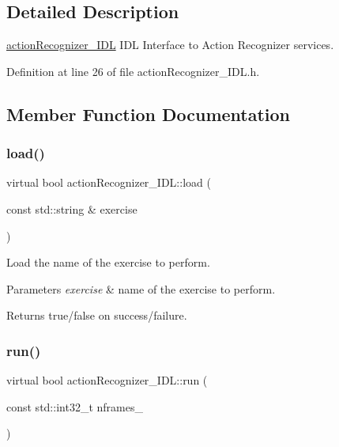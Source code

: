 \subsection{Detailed Description}
\mbox{\hyperlink{classactionRecognizer__IDL}{action\+Recognizer\+\_\+\+I\+DL}} I\+DL Interface to Action Recognizer services. 

Definition at line 26 of file action\+Recognizer\+\_\+\+I\+D\+L.\+h.



\subsection{Member Function Documentation}
\mbox{\label{classactionRecognizer__IDL_a59683b66e727607a3e12c0ab22d2d069}} 
\subsubsection{\texorpdfstring{load()}{load()}}
{\footnotesize\ttfamily virtual bool action\+Recognizer\+\_\+\+I\+D\+L\+::load (\begin{DoxyParamCaption}\item[{const std\+::string \&}]{exercise }\end{DoxyParamCaption})\hspace{0.3cm}{\ttfamily [virtual]}}



Load the name of the exercise to perform. 


\begin{DoxyParams}{Parameters}
{\em exercise} & name of the exercise to perform. \\
\hline
\end{DoxyParams}
\begin{DoxyReturn}{Returns}
true/false on success/failure. 
\end{DoxyReturn}
\mbox{\label{classactionRecognizer__IDL_a6e56afcbbc3a7c79deb5a7253b1d0b81}} 
\subsubsection{\texorpdfstring{run()}{run()}}
{\footnotesize\ttfamily virtual bool action\+Recognizer\+\_\+\+I\+D\+L\+::run (\begin{DoxyParamCaption}\item[{const std\+::int32\+\_\+t}]{nframes\+\_\+ }\end{DoxyParamCaption})\hspace{0.3cm}{\ttfamily [virtual]}}



